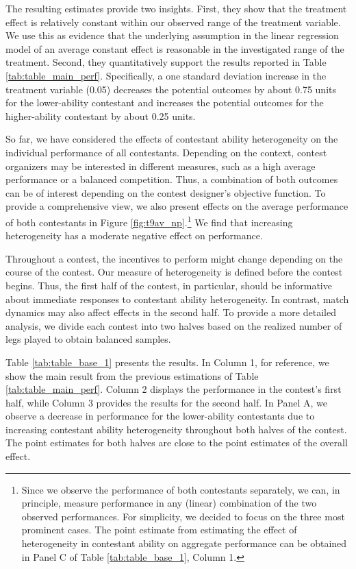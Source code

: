 \documentclass[11pt,a4paper]{article}
\begin{document}
The resulting estimates provide two insights. First, they show that the treatment effect is relatively constant within our observed range of the treatment variable. We use this as evidence that the underlying assumption in the linear regression model of an average constant effect is reasonable in the investigated range of the treatment. Second, they quantitatively support the results reported in Table \ref{tab:table_main_perf}. Specifically, a one standard deviation increase in the treatment variable (0.05) decreases the potential outcomes by about 0.75 units for the lower-ability contestant and increases the potential outcomes for the higher-ability contestant by about 0.25 units.\par

So far, we have considered the effects of contestant ability heterogeneity on the individual performance of all contestants. Depending on the context, contest organizers may be interested in different measures, such as a high average performance or a balanced competition. Thus, a combination of both outcomes can be of interest depending on the contest designer's objective function. To provide a comprehensive view,  we also present effects on the average performance of both contestants in Figure \ref{fig:t9av_np}.\footnote{Since we observe the performance of both contestants separately, we can, in principle, measure performance in any (linear) combination of the two observed performances. For simplicity, we decided to focus on the three most prominent cases. The point estimate from estimating the effect of heterogeneity in contestant ability on aggregate performance can be obtained in Panel C of Table \ref{tab:table_base_1}, Column 1.} We find that increasing heterogeneity has a moderate negative effect on performance.\par

Throughout a contest, the incentives to perform might change depending on the course of the contest. Our measure of heterogeneity is defined before the contest begins. Thus, the first half of the contest, in particular, should be informative about immediate responses to contestant ability heterogeneity. In contrast, match dynamics may also affect effects in the second half. To provide a more detailed analysis, we divide each contest into two halves based on the realized number of legs played to obtain balanced samples.\par

Table \ref{tab:table_base_1} presents the results. In Column 1, for reference, we show the main result from the previous estimations of Table \ref{tab:table_main_perf}. Column 2 displays the performance in the contest's first half, while Column 3 provides the results for the second half. In Panel A, we observe a decrease in performance for the lower-ability contestants due to increasing contestant ability heterogeneity throughout both halves of the contest. The point estimates for both halves are close to the point estimates of the overall effect.\par
\end{document}
